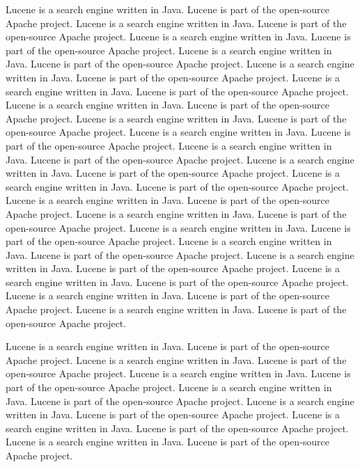 \documentclass[11pt]{book}
\begin{document}
Lucene is a search engine written in Java.  Lucene is part of the
open-source Apache project.
Lucene is a search engine written in Java.  Lucene is part of the
open-source Apache project.
Lucene is a search engine written in Java.  Lucene is part of the
open-source Apache project.
Lucene is a search engine written in Java.  Lucene is part of the
open-source Apache project.
Lucene is a search engine written in Java.  Lucene is part of the
open-source Apache project.
Lucene is a search engine written in Java.  Lucene is part of the
open-source Apache project.
Lucene is a search engine written in Java.  Lucene is part of the
open-source Apache project.
Lucene is a search engine written in Java.  Lucene is part of the
open-source Apache project.
Lucene is a search engine written in Java.  Lucene is part of the
open-source Apache project.
Lucene is a search engine written in Java.  Lucene is part of the
open-source Apache project.
Lucene is a search engine written in Java.  Lucene is part of the
open-source Apache project.
Lucene is a search engine written in Java.  Lucene is part of the
open-source Apache project.
Lucene is a search engine written in Java.  Lucene is part of the
open-source Apache project.
Lucene is a search engine written in Java.  Lucene is part of the
open-source Apache project.
Lucene is a search engine written in Java.  Lucene is part of the
open-source Apache project.
Lucene is a search engine written in Java.  Lucene is part of the
open-source Apache project.
Lucene is a search engine written in Java.  Lucene is part of the
open-source Apache project.
Lucene is a search engine written in Java.  Lucene is part of the
open-source Apache project.
Lucene is a search engine written in Java.  Lucene is part of the
open-source Apache project.
Lucene is a search engine written in Java.  Lucene is part of the
open-source Apache project.

Lucene is a search engine written in Java.  Lucene is part of the
open-source Apache project.
Lucene is a search engine written in Java.  Lucene is part of the
open-source Apache project.
Lucene is a search engine written in Java.  Lucene is part of the
open-source Apache project.
Lucene is a search engine written in Java.  Lucene is part of the
open-source Apache project.
Lucene is a search engine written in Java.  Lucene is part of the
open-source Apache project.
Lucene is a search engine written in Java.  Lucene is part of the
open-source Apache project.
Lucene is a search engine written in Java.  Lucene is part of the
open-source Apache project.
\end{document}
